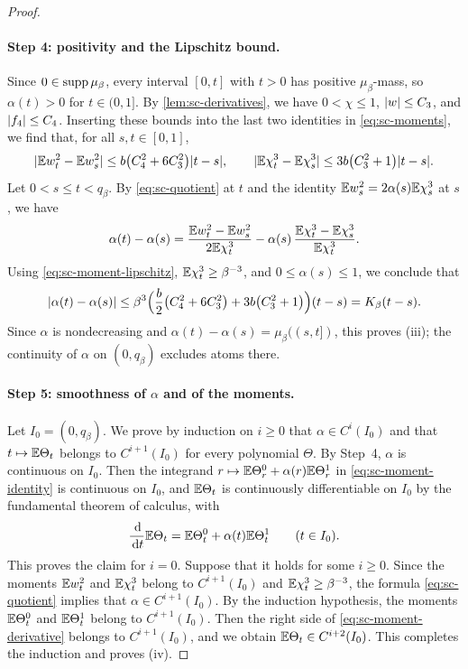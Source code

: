 \begin{proof}
\paragraph{Step 4: positivity and the Lipschitz bound.}
Since $0\in\operatorname{supp}\mu_\beta$, every interval $[0,t]$ with $t>0$ has
positive $\mu_\beta$-mass, so $\alpha(t)>0$ for $t\in(0,1]$. By
\cref{lem:sc-derivatives}, we have $0<\chi\le1$, $\lvert w\rvert\le C_3$, and
$\lvert f_4\rvert\le C_4$. Inserting these bounds into the last two identities in
\eqref{eq:sc-moments}, we find that, for all $s,t\in[0,1]$,
\begin{equation}\label{eq:sc-moment-lipschitz}
 \lvert \mathbb E w_t^2-\mathbb E w_s^2\rvert\le b\bigl(C_4^2+6C_3^2\bigr)\lvert t-s\rvert,\qquad
 \lvert \mathbb E\chi_t^3-\mathbb E\chi_s^3\rvert\le3b\bigl(C_3^2+1\bigr)\lvert t-s\rvert.
\end{equation}
Let $0<s\le t<q_\beta$. By \eqref{eq:sc-quotient} at $t$ and the identity
$\mathbb E w_s^2=2\alpha(s)\mathbb E\chi_s^3$ at $s$, we have
\[
 \alpha(t)-\alpha(s)
 =\frac{\mathbb E w_t^2-\mathbb E w_s^2}{2\mathbb E\chi_t^3}
   -\alpha(s)\,\frac{\mathbb E\chi_t^3-\mathbb E\chi_s^3}{\mathbb E\chi_t^3}.
\]
Using \eqref{eq:sc-moment-lipschitz}, $\mathbb E\chi_t^3\ge\beta^{-3}$, and
$0\le\alpha(s)\le1$, we conclude that
\[
 \lvert \alpha(t)-\alpha(s)\rvert
 \le\beta^3\Bigl(\frac{b}{2}\bigl(C_4^2+6C_3^2\bigr)
   +3b\bigl(C_3^2+1\bigr)\Bigr)(t-s)=K_\beta(t-s).
\]
Since $\alpha$ is nondecreasing and $\alpha(t)-\alpha(s)=\mu_\beta((s,t])$,
this proves (iii); the continuity of $\alpha$ on $(0,q_\beta)$ excludes
atoms there.

\paragraph{Step 5: smoothness of $\alpha$ and of the moments.}
Let $I_0=(0,q_\beta)$. We prove by induction on $i\ge0$ that
$\alpha\in C^i(I_0)$ and that $t\mapsto\mathbb E\Theta_t$ belongs to $C^{i+1}(I_0)$
for every polynomial $\Theta$. By Step~4, $\alpha$ is continuous on $I_0$.
Then the integrand $r\mapsto\mathbb E\Theta^0_r+\alpha(r)\mathbb E\Theta^1_r$ in
\eqref{eq:sc-moment-identity} is continuous on $I_0$, and $\mathbb E\Theta_t$ is
continuously differentiable on $I_0$ by the fundamental theorem of calculus,
with
\begin{equation}\label{eq:sc-moment-derivative}
 \frac{\,\mathrm d}{\,\mathrm d t}\mathbb E\Theta_t=\mathbb E\Theta^0_t+\alpha(t)\mathbb E\Theta^1_t
 \qquad(t\in I_0).
\end{equation}
This proves the claim for $i=0$. Suppose that it holds for some $i\ge0$.
Since the moments $\mathbb E w_t^2$ and $\mathbb E\chi_t^3$ belong to $C^{i+1}(I_0)$ and
$\mathbb E\chi_t^3\ge\beta^{-3}$, the formula \eqref{eq:sc-quotient} implies that
$\alpha\in C^{i+1}(I_0)$. By the induction hypothesis, the moments
$\mathbb E\Theta^0_t$ and $\mathbb E\Theta^1_t$ belong to $C^{i+1}(I_0)$. Then the right
side of \eqref{eq:sc-moment-derivative} belongs to $C^{i+1}(I_0)$, and we
obtain $\mathbb E\Theta_t\in C^{i+2}(I_0)$. This completes the induction and proves
(iv).


\end{proof}
